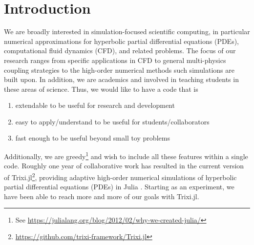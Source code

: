 \documentclass{juliacon}
\newcommand{\trixi}{Trixi.jl\xspace}
\begin{document}


\maketitle

\begin{abstract}
We present Trixi.jl, a Julia library for adaptive high-order numerical simulations
of hyperbolic partial differential equations (PDEs). Utilizing Julia's strengths,
Trixi.jl is extendable, easy to use, and fast. We describe the main design choices
that enable these features and compare Trixi.jl with an established open
source Fortran code for hyperbolic PDEs using the same numerical methods.
We conclude with an assessment of Julia for simulation-focused scientific
computing, an area that is still dominated by traditional high-performance
computing languages such as C, C++, and Fortran.
\end{abstract}


\section{Introduction}

We are broadly interested in simulation-focused scientific computing, in particular
numerical approximations for hyperbolic partial differential equations (PDEs), computational fluid dynamics (CFD),
and related problems. The focus of our research ranges from specific applications
in CFD to general multi-physics coupling strategies to the high-order numerical methods 
such simulations are built upon. In addition, we are academics and involved in teaching 
students in these areas of science. Thus, we would like to have a 
code that is
\begin{enumerate}
  \item extendable to be useful for research and development
  \item easy to apply/understand to be useful for students/collaborators
  \item fast enough to be useful beyond small toy problems
\end{enumerate}
Additionally, we are greedy\footnote{See \url{https://julialang.org/blog/2012/02/why-we-created-julia/}} 
and wish to include all these features within a single code.
Roughly one year of collaborative work has resulted in the current version of
\trixi\footnote{\url{https://github.com/trixi-framework/Trixi.jl}}, providing adaptive
high-order numerical simulations of hyperbolic partial differential equations (PDEs)
in Julia \cite{bezanson2017julia}. Starting as an experiment, we have been able
to reach more and more of our goals with \trixi.
\end{document}
